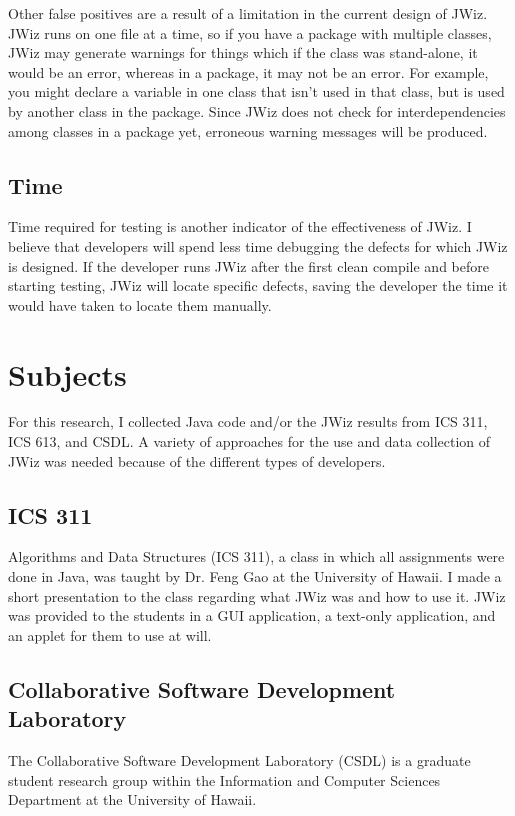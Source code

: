 Other false positives are a result of a limitation in the current design of 
JWiz.  JWiz runs on one file at a time, so if you have a package with
multiple classes, JWiz may generate warnings for things which if the class
was stand-alone, it would be an error, whereas in a package, it may not be
an error.  For example, you might declare a variable in one class that
isn't used in that class, but is used by another class in the package.
Since JWiz does not check for interdependencies among classes in a package
yet, erroneous warning messages will be produced.

\subsection{Time}
Time required for testing is another indicator of the effectiveness of
JWiz.  I believe that developers will spend less time debugging the defects
for which JWiz is designed.  If the developer runs JWiz after the first
clean compile and before starting testing, JWiz will locate specific
defects, saving the developer the time it would have taken to locate them
manually.

\section{Subjects}
For this research, I collected Java code and/or the JWiz results from ICS
311, ICS 613, and CSDL.  A variety of approaches for the use and data
collection of JWiz was needed because of the different types of developers.

\subsection{ICS 311}
Algorithms and Data Structures (ICS 311), a class in which all assignments
were done in Java, was taught by Dr.  Feng Gao at the University of Hawaii.
I made a short presentation to the class regarding what JWiz was and how to
use it.  JWiz was provided to the students in a GUI application, a
text-only application, and an applet for them to use at will.

\subsection{Collaborative Software Development Laboratory}
The Collaborative Software Development Laboratory (CSDL) is a graduate
student research group within the Information and Computer Sciences
Department at the University of Hawaii.

